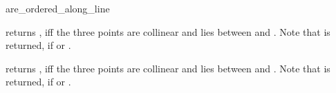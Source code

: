 \begin{ccRefFunction}{are_ordered_along_line}

         {returns , iff the three points are collinear and 
           lies between  and .
          Note that  is returned, if  or
          .}

         {returns , iff the three points are collinear and 
           lies between  and .
          Note that  is returned, if  or
          .}
\end{ccRefFunction}

